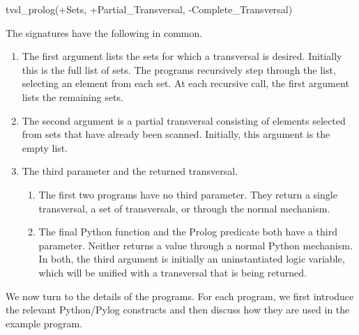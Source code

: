 \begin{python}
tvsl_prolog(+Sets, +Partial_Transversal, -Complete_Transversal)
\end{python}

The signatures have the following in common. 
\begin{enumerate}
\item The first argument lists the sets for which a transversal is desired. Initially this is the full list of sets. The programs recursively step through the list, selecting an element from each set. At each recursive call, the first argument lists the remaining sets. 

\item The second argument is a partial transversal consisting of elements selected from sets that have already been scanned. Initially, this argument is the empty list.

\item The third parameter and the returned transversal.
    \begin{enumerate}
    \item The first two programs have no third parameter. They return a single transversal, a set of transversals, or  through the normal  mechanism.
    
    \item The final Python function and the Prolog predicate both have a third parameter. Neither returns a value through a normal Python  mechanism. In both, the third argument is initially an uninstantiated logic variable, which will be unified with a transversal that is being returned.
    \end{enumerate}
\end{enumerate}

We now turn to the details of the programs. For each program, we first introduce the relevant Python/Pylog constructs and then discuss how they are used in the example program.

\subsection{}


